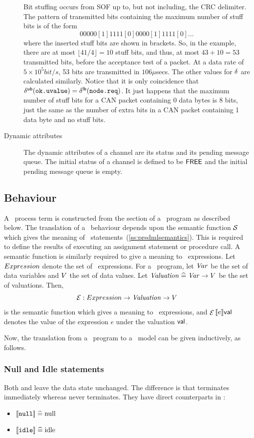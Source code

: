 \begin{description}
Bit stuffing occurs from SOF up to, but not including, the CRC
delimiter. The pattern of transmitted bits containing the maximum number of
stuff bits is of the form
\[00000[1]1111[0]0000[1]1111[0]\ldots\]
where the inserted stuff bits are shown in brackets.
So, in the example, there are at most $\lfloor 41 / 4 \rfloor = 10$ stuff
bits, and thus, at most $43 + 10 = 53$ transmitted bits, before the
acceptance test of a  packet. At a data rate of $5
\times 10^5 bit/s$, 53 bits are transmitted in $106\mu$secs. The other values
for $\delta$ are calculated similarly. Notice that it is only coincidence
that ${\delta^{{\sf ub}}}(\mbox{\tt ok.uvalue}) = {\delta^{{\sf lb}}}(\mbox{\tt node.req})$. It just happens that
the maximum number of stuff bits for a CAN packet containing 0 data bytes
is 8 bits, just the same as the number of extra bits in a CAN packet
containing 1 data byte and no stuff bits.  
\item[Dynamic attributes]
The dynamic attributes of a channel are its status and its pending message 
queue. The initial status of a channel is defined to be ${\sf FREE}$ and
the initial pending message queue is empty.
\end{description}
 
\subsection{Behaviour}\label{ss:prbehaviourmodel}
A \bcandle\ process term is constructed from the 
section of a \candle\ program as described below.  The translation of
a \candle\ behaviour depends upon the semantic function
$\evalCanSmntFN$ which gives the meaning of \sdml\
statements~(\Sec\ref{ss:prsdmlsemantics}).  This is required to define
the results of executing an assignment statement or procedure call. A
semantic function is similarly required to give a meaning to \candle\
expressions.  Let ${Expression}$ denote the set of \candle\
expressions. For a \candle\ program, let ${\text{\it Var\/}}$ be the set of data
variables and $V$ the set of data values. Let ${\text{\it Valuation\/}} \mathrel{\widehat=} {\text{\it Var\/}}
\rightarrow V$ be the set of valuations. Then, 
\[ \evalCanExprFN : \canExpr \fun \valuation \fun \V \]
is the semantic function which gives a meaning to \candle\ expressions,
and $\evalCanExpr{e}\val$ denotes the value of the expression $e$
under the valuation ${\mathop{\sf val}}$. 

Now, the translation from a \candle\ program to a \bcandle\ model
can be given inductively, as follows.
 
\subsubsection{Null and Idle statements}
Both  and  leave the data state unchanged. The difference 
is that \trm{null} terminates immediately whereas \trm{idle} never terminates.
They have direct counterparts in \bcandle:
\begin{itemize}
\item ${\lbrack\!\lbrack} \mbox{\tt null} {\rbrack\!\rbrack} \mathrel{\widehat=} \mathrm{null}$
\item ${\lbrack\!\lbrack} \mbox{\tt idle} {\rbrack\!\rbrack} \mathrel{\widehat=} \mathrm{idle}$  
\end{itemize}

